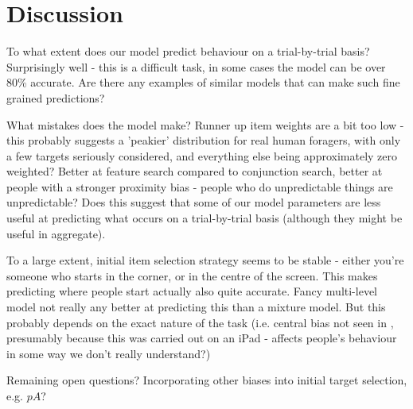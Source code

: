 \documentclass[vision,article,submit,pdftex,moreauthors]{Definitions/mdpi}
\begin{document}
\section{Discussion}

To what extent does our model predict behaviour on a trial-by-trial basis? Surprisingly well - this is a difficult task, in some cases the model can be over 80\% accurate. Are there any examples of similar models that can make such fine grained predictions?

What mistakes does the model make? 
Runner up item weights are a bit too low - this probably suggests a 'peakier' distribution for real human foragers, with only a few targets seriously considered, and everything else being approximately zero weighted?
Better at feature search compared to conjunction search, better at people with a stronger proximity bias - people who do unpredictable things are unpredictable? Does this suggest that some of our model parameters are less useful at predicting what occurs on a trial-by-trial basis (although they might be useful in aggregate).

To a large extent, initial item selection strategy seems to be stable - either you're someone who starts in the corner, or in the centre of the screen. This makes predicting where people start actually also quite accurate. Fancy multi-level model not really any better at predicting this than a mixture model. But this probably depends on the exact nature of the task (i.e. central bias not seen in \citep{kristjansson2014}, presumably because this was carried out on an iPad - affects people's behaviour in some way we don't really understand?)

Remaining open questions?
Incorporating other biases into initial target selection, e.g. $pA$?


\vspace{6pt} 


\end{document}
